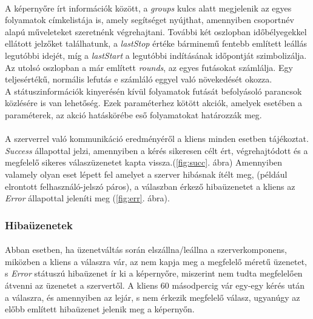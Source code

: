 \documentclass[12pt]{report}
\begin{document}
  \paragraph{}
  A képernyőre írt információk között, a \textit{groups} kulcs alatt megjelenik az egyes folyamatok címkelistája is, amely segítséget nyújthat, amennyiben csoportnév alapú műveleteket szeretnénk végrehajtani. 
  További két oszlopban időbélyegekkel ellátott jelzőket találhatunk, a \textit{lastStop} értéke bárminemű fentebb említett leállás legutóbbi idejét, míg a \textit{lastStart} a legutóbbi indításának időpontját szimbolizálja.
  Az utolsó oszlopban a már említett \textit{rounds}, az egyes futásokat számlálja. Egy teljesértékű, normális lefutás e számláló eggyel való növekedését okozza.
 \\
 A státuszinformációk kinyerésén kívül folyamatok futását befolyásoló parancsok közlésére is van lehetőség. Ezek paraméterhez kötött akciók, amelyek esetében a paraméterek, az akció hatáskörébe eső folyamatokat határozzák meg.
 \paragraph{}
 A szerverrel való kommunikáció eredményéről a kliens minden esetben tájékoztat. \textit{Success} állapottal jelzi, amennyiben a kérés sikeresen célt ért, végrehajtódott és a megfelelő sikeres válaszüzenetet kapta vissza.(\ref{fig:succ}. ábra) 
Amennyiben valamely olyan eset lépett fel amelyet a szerver hibásnak ítélt meg, (például elrontott felhasználó-jelszó páros), a válaszban érkező hibaüzenetet a kliens az \textit{Error} állapottal jeleníti meg (\ref{fig:err}. ábra).
  
  \subsubsection{Hibaüzenetek}
  \paragraph{}
 Abban esetben, ha üzenetváltás során elszállna/leállna a szerverkomponens, miközben a kliens a válaszra vár, az nem kapja meg a megfelelő méretű üzenetet, s \textit{Error} státuszú hibaüzenet ír ki a képernyőre, miszerint nem tudta megfelelően átvenni az üzenetet a szervertől. A kliens 60 másodpercig vár egy-egy kérés után a válaszra, és amennyiben az lejár, s nem érkezik megfelelő válasz, ugyanúgy az előbb említett hibaüzenet jelenik meg a képernyőn. 
 
\end{document}
